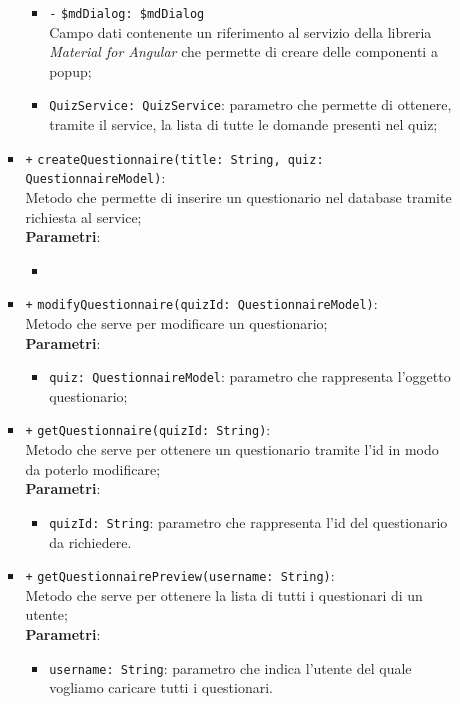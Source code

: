 \begin{itemize}
\begin{itemize}
\begin{itemize}
\begin{itemize}
			\item \texttt{-} \texttt{\$mdDialog: \$mdDialog} \\
			Campo dati contenente un riferimento al servizio della libreria \textit{Material for Angular} che permette di creare delle componenti a popup;
			\item \texttt{QuizService: QuizService}: parametro che permette di ottenere, tramite il service, la lista di tutte le domande presenti nel quiz;
		\end{itemize}
		\item \texttt{+} \texttt{createQuestionnaire(title: String, quiz: QuestionnaireModel)}: \\Metodo che permette di inserire un questionario nel database tramite richiesta al service; \\
			\textbf{Parametri}:
			\begin{itemize}
				\item 
			\end{itemize}
		\item \texttt{+} \texttt{modifyQuestionnaire(quizId: QuestionnaireModel)}: \\ Metodo che serve per modificare un questionario; \\
			\textbf{Parametri}:
			\begin{itemize}
				\item \texttt{quiz: QuestionnaireModel}: parametro che rappresenta l'oggetto questionario;
			\end{itemize}
		\item \texttt{+} \texttt{getQuestionnaire(quizId: String)}: \\Metodo che serve per ottenere un questionario tramite l'id in modo da poterlo modificare; \\
			\textbf{Parametri}:
			\begin{itemize}
				\item \texttt{quizId: String}: parametro che rappresenta l'id del questionario da richiedere.
			\end{itemize}
		\item \texttt{+} \texttt{getQuestionnairePreview(username: String)}: \\ Metodo che serve per ottenere la lista di tutti i questionari di un utente; \\
			\textbf{Parametri}:
			\begin{itemize}
				\item \texttt{username: String}: parametro che indica l'utente del quale vogliamo caricare tutti i questionari.
			\end{itemize}
	\end{itemize}
\end{itemize}


\end{itemize}

